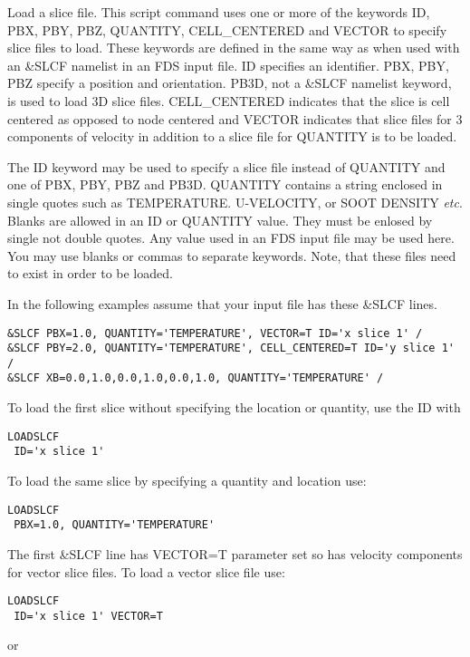 \documentclass[11pt,twoside]{book}
\newcommand{\hitem}[1]{\item[{\bf #1} \hfill]}
\begin{document}
\hitem{LOADSLCF}Load a slice file.
This script command uses one or more of the keywords ID, PBX, PBY, PBZ, QUANTITY, CELL\_CENTERED and VECTOR to specify slice files to load.
These keywords are defined in the same way as when used with an \&SLCF namelist in an FDS input file.
ID specifies an identifier.  PBX, PBY, PBZ specify a position and orientation.
PB3D, not a \&SLCF namelist keyword, is used to load 3D slice files.
CELL\_CENTERED indicates that the slice is cell centered as opposed to node centered
and VECTOR indicates that slice files for 3 components of velocity in addition to a slice file for QUANTITY is to be loaded.

The ID keyword may be used to specify a slice file instead of QUANTITY and one of PBX, PBY, PBZ and PB3D.
QUANTITY contains a string enclosed in single quotes such as
TEMPERATURE. U-VELOCITY, or SOOT DENSITY {\em etc}.
Blanks are allowed in an ID or QUANTITY value.  They must be enlosed by single not double quotes.
Any value used in an FDS input file may be used here. You may use blanks or commas to separate keywords.
Note, that these files need to exist in order to be loaded.

In the following examples assume that your input file has these  \&SLCF lines.

\begin{lstlisting}
&SLCF PBX=1.0, QUANTITY='TEMPERATURE', VECTOR=T ID='x slice 1' /
&SLCF PBY=2.0, QUANTITY='TEMPERATURE', CELL_CENTERED=T ID='y slice 1' /
&SLCF XB=0.0,1.0,0.0,1.0,0.0,1.0, QUANTITY='TEMPERATURE' /
\end{lstlisting}


\noindent To load the first slice without specifying the location or quantity, use the ID with
\begin{lstlisting}
LOADSLCF
 ID='x slice 1'
\end{lstlisting}

\noindent To load the same slice by specifying a quantity and location use:
\begin{lstlisting}
LOADSLCF
 PBX=1.0, QUANTITY='TEMPERATURE'
\end{lstlisting}

\noindent The first \&SLCF line has VECTOR=T parameter set so has velocity components for vector slice files.
To load a vector slice file use:
\begin{lstlisting}
LOADSLCF
 ID='x slice 1' VECTOR=T
\end{lstlisting}

\noindent or
\end{document}
